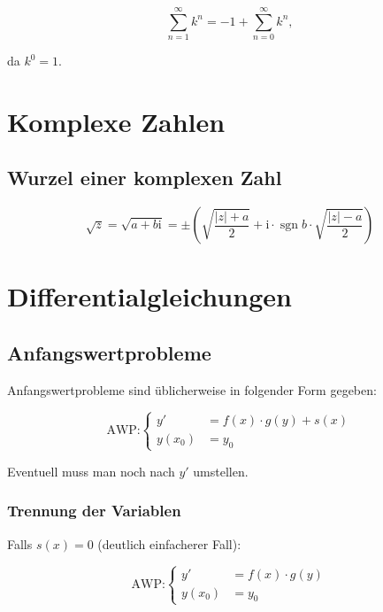\documentclass[a4paper, 16pt]{article}
\newcommand{\cmi}{\mathrm{i}}
\DeclareMathOperator{\sgn}{sgn}
\begin{document}
	\begin{equation*}
		\sum\limits_{n = 1}^{\infty}{k^n} = -1 + \sum\limits_{n = 0}^{\infty}{k^n},
	\end{equation*}

	da $k^0 = 1$.

	\section{Komplexe Zahlen}

	\subsection{Wurzel einer komplexen Zahl}

	\begin{equation*}
		\sqrt{z} = \sqrt{a + b\cmi} = \pm \left(\sqrt{\frac{|z| + a}{2}} + \cmi \cdot \sgn{b} \cdot \sqrt{\frac{|z| - a}{2}} \right)
	\end{equation*}

	\section{Differentialgleichungen}

	\subsection{Anfangswertprobleme}

	Anfangswertprobleme sind üblicherweise in folgender Form gegeben:

	\begin{equation*}
		\textrm{AWP:}
		\begin{cases}
			y' &= f(x) \cdot g(y) + s(x) \\
			y(x_0) &= y_0
		\end{cases}
	\end{equation*}

	Eventuell muss man noch nach $y'$ umstellen.

	\subsubsection{Trennung der Variablen}

	Falls $s(x) = 0$ (deutlich einfacherer Fall):

	\begin{equation*}
		\textrm{AWP:}
		\begin{cases}
			y' &= f(x) \cdot g(y) \\
			y(x_0) &= y_0
		\end{cases}
	\end{equation*}
\end{document}
